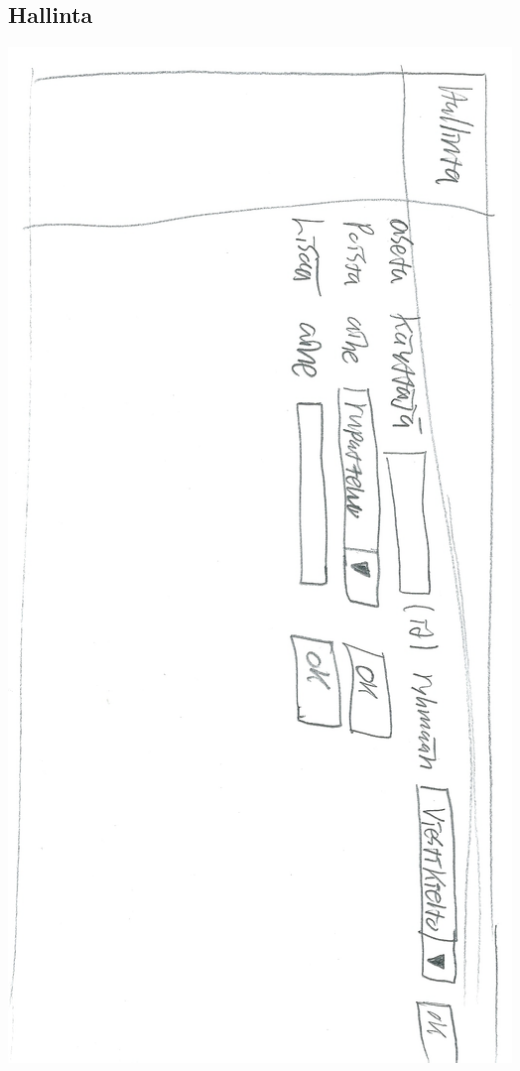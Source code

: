 \documentclass[a4paper, 12pt, finnish]{article}
\begin{document}
\subsection{Hallinta}
\includegraphics[width=\textwidth,height=\textheight,keepaspectratio]{hallinta.png}
\end{document}
